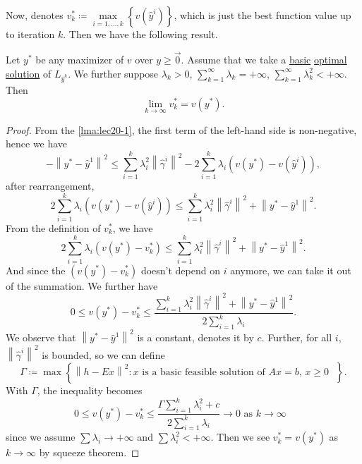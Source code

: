 Now, denotes \(v^{\ast}_{k}\coloneqq \max\limits_{i = 1, \dots , k}\left\{v(\hat{y}^i)\right\}\), which is just the best function value up to iteration \(k\). Then we have the following result.

\begin{theorem}\label{thm:lec20-1}
	Let \(y^{\ast}\) be any maximizer of \(v\) over \(y\geq \vec{0}\). Assume that we take a \hyperref[def:basic-solution]{basic} \hyperref[def:optimal-solution]{optimal solution}
	of \(L_{\hat{y}^k}\). We further suppose \(\lambda_{k}>0\), \(\sum\limits_{k=1}^{\infty} \lambda_{k} = +\infty \), \(\sum\limits_{k=1}^{\infty} \lambda_{k}^2< +\infty\). Then
	\[
		\lim_{k \to \infty} v^{\ast}_k = v(y^{\ast}).
	\]
\end{theorem}
\begin{proof}
	From the \autoref{lma:lec20-1}, the first term of the left-hand side is non-negative, hence we have
	\[
		- \left\lVert y^{\ast} - \hat{y}^1\right\rVert^2 \leq \sum\limits_{i=1}^{k} \lambda_{i}^{2}\left\lVert \hat{\gamma}^i\right\rVert^2 - 2 \sum\limits_{i=1}^{k} \lambda_{i}\left(v(y^{\ast}) - v(\hat{y}^i)\right),
	\]
	after rearrangement,
	\[
		2 \sum\limits_{i=1}^{k} \lambda_{i}\left(v(y^{\ast}) - v(\hat{y}^i)\right)\leq \sum\limits_{i=1}^{k} \lambda_{i}^{2}\left\lVert \hat{\gamma}^i\right\rVert^2 + \left\lVert y^{\ast} - \hat{y}^1\right\rVert^2.
	\]
	From the definition of \(v^{\ast}_{k}\), we have
	\[
		2 \sum\limits_{i=1}^{k} \lambda_{i}\left(v(y^{\ast}) - v^{\ast}_{k}\right)\leq \sum\limits_{i=1}^{k} \lambda_{i}^{2}\left\lVert \hat{\gamma}^i\right\rVert^2 + \left\lVert y^{\ast} - \hat{y}^1\right\rVert^2.
	\]
	And since the \(\left(v(y^{\ast}) - v^{\ast}_{k}\right)\) doesn't depend on \(i\) anymore, we can take it out of the summation. We further have
	\[
		0\leq v(y^{\ast}) - v^{\ast}_{k}\leq \frac{\sum\limits_{i=1}^{k} \lambda_{i}^{2}\left\lVert \hat{\gamma}^i\right\rVert^2 + \left\lVert y^{\ast} - \hat{y}^1\right\rVert^2}{2 \sum\limits_{i=1}^{k} \lambda_{i}}.
	\]
	We observe that \(\left\lVert y^{\ast} - \hat{y}^1\right\rVert^2 \) is a constant, denotes it by \(c\). Further, for all \(i\), \(\left\lVert \hat{\gamma}^i\right\rVert^2 \) is bounded, so we can define
	\[
		\Gamma\coloneqq \max\left\{\left\lVert h - Ex\right\rVert^2\colon \text{\(x\) is a basic feasible solution of \(Ax = b\), \(x\geq 0\)  }\right\}.
	\]
	With \(\Gamma\), the inequality becomes
	\[
		0\leq v(y^{\ast}) - v^{\ast}_{k}\leq \frac{\Gamma\sum\limits_{i=1}^{k} \lambda_{i}^{2} + c}{2 \sum\limits_{i=1}^{k} \lambda_{i}}\to 0 \text{ as \(k \to  \infty \) }
	\]
	since we assume \(\sum \lambda_{i} \to  +\infty \) and \(\sum\limits\lambda_{i}^{2}< +\infty  \). Then we see \(v^{\ast}_{k} = v(y^{\ast})\) as \(k \to \infty \) by squeeze theorem.
\end{proof}


